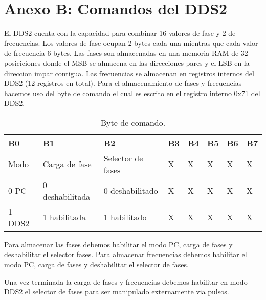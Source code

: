\section{Anexo B: Comandos del DDS2}
El DDS2 cuenta con la capacidad para combinar 16 valores de fase y 2 de frecuencias.
Los valores de fase ocupan 2 bytes cada una mientras que cada valor de frecuencia 6 bytes.
Las fases son almacenadas en una memoria RAM de 32 posiciciones donde el MSB se
almacena en las direcciones pares y el LSB en la direccion impar contigua.
Las frecuencias se almacenan en registros internos del DDS2 (12 registros en total).
Para el almacenamiento de fases y frecuencias hacemos uso del byte de comando
el cual es escrito en el registro interno 0x71 del DDS2. 

\begin{table}[ht]
    \centering
    \begin{tabular}{|l|l|l|l|l|l|l|l|}
    \hline 
    B0 & B1 & B2 & B3 & B4 & B5 & B6 & B7 \\
    \hline
    Modo   & Carga de fase    & Selector de fases & X & X & X & X & X\\
    \hline
    0 PC   & 0 deshabilitada  & 0 deshabilitado   & X & X & X & X & X\\
    1 DDS2 & 1 habilitada     & 1 habilitado      & X & X & X & X & X\\
    \hline
\end{tabular}
\caption{\label{tab:dds2_byte_comando}Byte de comando.}
\end{table}

Para almacenar las fases debemos habilitar el modo PC, carga de fases y deshabilitar el selector fases.
Para almacenar frecuencias debemos habilitar el modo PC, carga de fases y deshabilitar el selector de fases.

Una vez terminada la carga de fases y frecuencias debemos habilitar en modo DDS2 el selector de fases para
ser manipulado externamente via pulsos.

